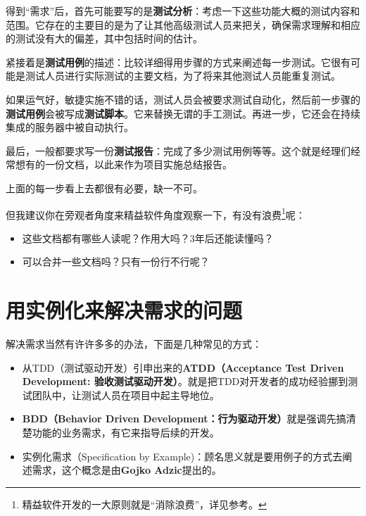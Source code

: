 得到“需求”后，首先可能要写的是\textbf{测试分析}：考虑一下这些功能大概的测试内容和范围。它存在的主要目的是为了让其他高级测试人员来把关，确保需求理解和相应的测试没有大的偏差，其中包括时间的估计。

紧接着是\textbf{测试用例}的描述：比较详细得用步骤的方式来阐述每一步测试。它很有可能是测试人员进行实际测试的主要文档，为了将来其他测试人员能重复测试。

如果运气好，敏捷实施不错的话，测试人员会被要求测试自动化，然后前一步骤的\textbf{测试用例}会被写成\textbf{测试脚本}。它来替换无谓的手工测试。再进一步，它还会在持续集成的服务器中被自动执行。

最后，一般都要求写一份\textbf{测试报告}：完成了多少测试用例等等。这个就是经理们经常想有的一份文档，以此来作为项目实施总结报告。

上面的每一步看上去都很有必要，缺一不可。

但我建议你在旁观者角度来精益软件角度观察一下，有没有浪费\footnote{精益软件开发的一大原则就是“消除浪费”，详见参考。}呢：

\begin{itemize}
\item 这些文档都有哪些人读呢？作用大吗？3年后还能读懂吗？

\item 可以合并一些文档吗？只有一份行不行呢？

\end{itemize}

\section{用实例化来解决需求的问题}
\label{用实例化来解决需求的问题}

解决需求当然有许许多多的办法，下面是几种常见的方式：

\begin{itemize}
\item 从TDD（测试驱动开发）引申出来的\textbf{ATDD（Acceptance Test Driven Development: 验收测试驱动开发）}。就是把TDD对开发者的成功经验挪到测试团队中，让测试人员在项目中起主导地位。

\item \textbf{BDD（Behavior Driven Development：行为驱动开发）}就是强调先搞清楚功能的业务需求，有它来指导后续的开发。

\item 实例化需求（Specification by Example)：顾名思义就是要用例子的方式去阐述需求，这个概念是由\textbf{Gojko Adzic}提出的。

\end{itemize}

